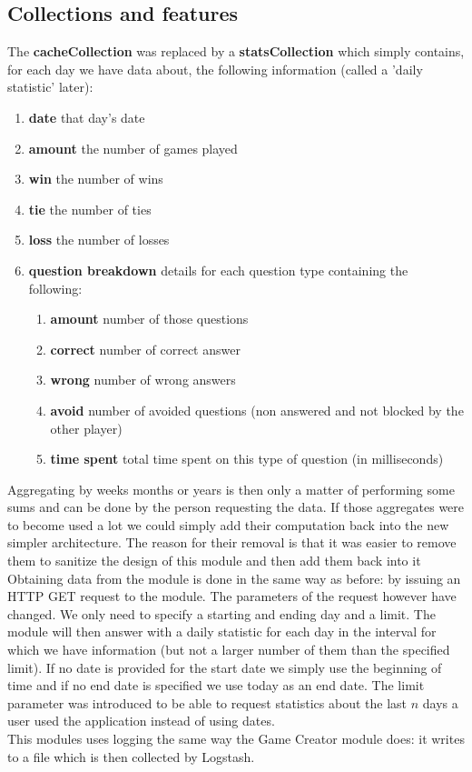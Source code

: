 \subsection{Collections and features}
The \textbf{cacheCollection} was replaced by a \textbf{statsCollection} which simply contains, for each day we have data about, the following information (called a 'daily statistic' later):
\begin{enumerate}
	\item \textbf{date} that day's date
	\item \textbf{amount} the number of games played
	\item \textbf{win} the number of wins
	\item \textbf{tie} the number of ties
	\item \textbf{loss} the number of losses
	\item \textbf{question breakdown} details for each question type containing the following:
	\begin{enumerate}
		\item \textbf{amount} number of those questions
		\item \textbf{correct} number of correct answer
		\item \textbf{wrong} number of wrong answers
		\item \textbf{avoid} number of avoided questions (non answered and not blocked by the other player)
		\item \textbf{time spent} total time spent on this type of question (in milliseconds)
	\end{enumerate}
\end{enumerate}
Aggregating by weeks months or years is then only a matter of performing some sums and can be done by the person requesting the data. If those aggregates were to become used a lot we could simply add their computation back into the new simpler architecture. The reason for their removal is that it was easier to remove them to sanitize the design of this module and then add them back into it\\
Obtaining data from the module is done in the same way as before: by issuing an HTTP GET request to the module. The parameters of the request however have changed. We only need to specify a starting and ending day and a limit. The module will then answer with a daily statistic for each day in the interval for which we have information (but not a larger number of them than the specified limit). If no date is provided for the start date we simply use the beginning of time and if no end date is specified we use today as an end date. The limit parameter was introduced to be able to request statistics about the last $n$ days a user used the application instead of using dates.\\
This modules uses logging the same way the Game Creator module does: it writes to a file which is then collected by Logstash.

